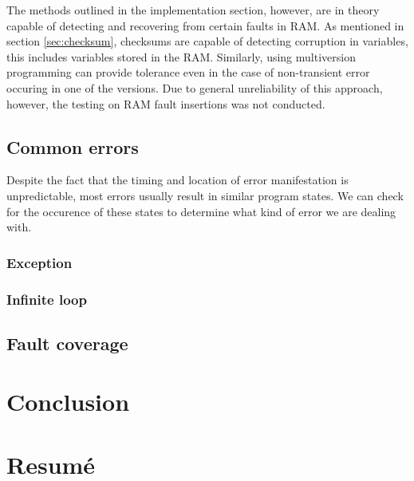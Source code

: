 \documentclass[12pt, letterpaper]{article}
\begin{document}
The methods outlined in the implementation section, however, are in theory capable of detecting and recovering from certain faults in RAM. As mentioned in section \ref{sec:checksum}, checksums are capable of detecting corruption in variables, this includes variables stored in the RAM. Similarly, using multiversion programming can provide tolerance even in the case of non-transient error occuring in one of the versions. Due to general unreliability of this approach, however, the testing on RAM fault insertions was not conducted.

\subsection{Common errors}

Despite the fact that the timing and location of error manifestation is unpredictable, most errors usually result in similar program states. We can check for the occurence of these states to determine what kind of error we are dealing with.

\subsubsection{Exception}

\subsubsection{Infinite loop}

\subsubsection{}


\subsection{Fault coverage}

\clearpage
\section{Conclusion}


\clearpage
\section{Resumé}

\newpage
\printbibliography
\end{document}

